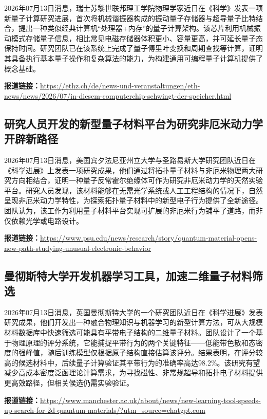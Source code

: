 \documentclass[12pt,a4paper]{ctexart}
\begin{document}
2026年07月13日消息，瑞士苏黎世联邦理工学院物理学家近日在《科学》发表一项新量子计算研究进展，首次将机械谐振器构成的振动量子存储器与超导量子比特结合，提出一种类似经典计算机“处理器+内存”的量子计算架构。该芯片利用机械振动模式存储量子信息，相比常见电磁存储器体积更小、容量更高，并可延长量子态保持时间。研究团队已在该系统上完成了量子傅里叶变换和周期查找等计算，证明其具备执行基本量子操作和复杂算法的能力，为构建通用可编程量子计算机提供了概念基础。

\noindent\textbf{报道链接：}\url{https://ethz.ch/de/news-und-veranstaltungen/eth-news/news/2026/07/in-diesem-computerchip-schwingt-der-speicher.html}

\subsection{ 研究人员开发的新型量子材料平台为研究非厄米动力学开辟新路径 }

2026年07月13日消息，美国宾夕法尼亚州立大学与圣路易斯大学研究团队近日在《科学进展》上发表一项研究成果，他们通过将拓扑量子材料与非厄米物理两大研究方向相结合，证明一种量子反常霍尔绝缘体可作为研究非厄米动力学的天然实验平台。研究人员发现，该材料能够在无需光学系统或人工工程结构的情况下，自然呈现非厄米动力学特性，为探索拓扑量子材料中的新型电子行为提供了全新途径。团队认为，该工作为利用量子材料平台实现可扩展的非厄米行为铺平了道路，而非仅依赖光学或电路设计。

\noindent\textbf{报道链接：}\url{https://www.psu.edu/news/research/story/quantum-material-opens-new-path-studying-unusual-electronic-behavior}

\subsection{ 曼彻斯特大学开发机器学习工具，加速二维量子材料筛选 }

2026年07月13日消息，英国曼彻斯特大学的一个研究团队近日在《科学进展》发表研究成果，他们开发出一种融合物理知识与机器学习的新型计算方法，可从大规模材料数据库中快速筛选可能具有平带电子结构的二维量子材料。团队设计了一个基于物理原理的评分系统，它能捕捉平带行为的两个关键特征——低能带色散和态密度的强峰值，随后训练模型仅根据原子结构直接估算该评分。结果表明，在评分较高的候选材料中，后续量子计算验证其平带行为的准确率高达98.2\%。该研究有望减少高成本密度泛函理论计算需求，为寻找磁性、非常规超导和拓扑电子材料提供更高效路径，但相关候选仍需实验验证。

\noindent\textbf{报道链接：}\url{https://www.manchester.ac.uk/about/news/new-learning-tool-speeds-up-search-for-2d-quantum-materials/?utm\_source=chatgpt.com}
\end{document}
